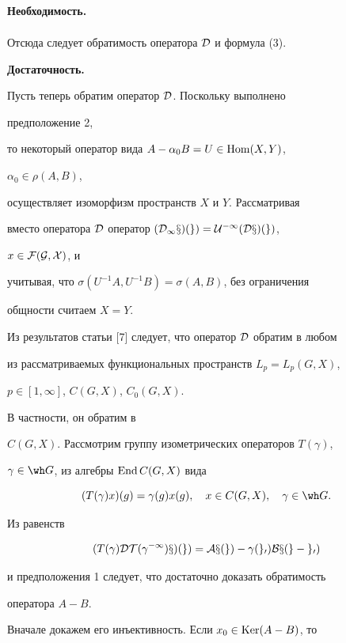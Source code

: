 \begin{pf}{\bf Необходимость.}
\begin{align*}
\end{align*} 


Отсюда следует обратимость оператора $\cal D$ и формула (3). 


 


{\bf Достаточность.}


Пусть теперь обратим оператор $\cal D$. Поскольку выполнено 


предположение 2, 


то некоторый оператор вида $A-\alpha_0B=U\in\operatorname{Hom}(X,Y)$, 


$\alpha_0\in\rho(A,B)$, 


осуществляет изоморфизм пространств $X$ и $Y$. Рассматривая 


вместо оператора $\cal D$ оператор $(\cal D_1x)(g)=U^{-1}(\cal D x)(g)$, 


$x\in\cal F(G,X)$, и 


учитывая, что $\sigma(U^{-1}A,U^{-1}B)=\sigma(A,B)$, без ограничения 


общности считаем $X=Y$. 


 


Из результатов статьи [7] следует, что оператор $\cal D$ обратим в любом 


из рассматриваемых функциональных пространств $L_p=L_p(G,X)$, 


$p\in[1,\infty]$, $C(G,X)$, $C_0(G,X)$. 


В частности, он обратим в 


$C(G,X)$. Рассмотрим группу изометрических операторов $T(\gamma)$, 


$\gamma\in\wh G$, из алгебры $\operatorname{End} C(G,X)$ вида 


$$ 


(T(\gamma)x)(g)=\gamma(g)x(g),\quad x\in C(G,X),\quad 


\gamma\in\wh G. 


$$ 


Из равенств 


$$ 


(T(\gamma)\cal D T(\gamma^{-1})x)(g)=A x(g)- 


\gamma(g_0)B x(g-g_0) 


$$ 


и предположения 1 следует, что достаточно доказать обратимость 


оператора $A-B$. 


 


Вначале докажем его инъективность. Если $x_0\in\operatorname{Ker}(A-B)$, то 



\end{pf}
